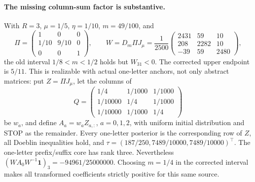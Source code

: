 \paragraph{The missing column-sum factor is substantive.}
With $R=3$, $\mu=1/5$, $\eta=1/10$, $m=49/100$, and
\[
 \Pi=\begin{pmatrix}1&0&0\\1/10&9/10&0\\0&0&1\end{pmatrix},
 \qquad
 W=D_m\Pi J_\mu
   =\frac1{2500}\begin{pmatrix}2431&59&10\\208&2282&10\\-39&59&2480\end{pmatrix},
\]
the old interval $1/8<m<1/2$ holds but $W_{31}<0$.
The corrected upper endpoint is $5/11$. This is realizable with
actual one-letter anchors, not only abstract matrices: put $Z=\Pi J_\mu$,
let the columns of
\[
 Q=\begin{pmatrix}1/4&1/1000&1/1000\\
                  1/10000&1/4&1/1000\\
                  1/10000&1/1000&1/4\end{pmatrix}
\]
be $w_a$, and define $A_a=w_aZ_{a,:}$, $a=0,1,2$, with uniform
initial distribution and STOP as the remainder. Every one-letter
posterior is the corresponding row of $Z$, all Doeblin inequalities
hold, and $\tau=(187/250,7489/10000,7489/10000)^\top$.
The one-letter prefix/suffix core has rank three. Nevertheless
$(WA_0W^{-1}\mathbf1)_3=-94961/25000000$.
Choosing $m=1/4$ in the corrected interval makes all transformed
coefficients strictly positive for this same source.


